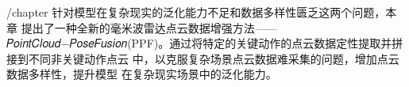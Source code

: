 /chapter{}
针对模型在复杂现实的泛化能力不足和数据多样性匮乏这两个问题，本章
提出了一种全新的毫米波雷达点云数据增强方法——𝑃𝑜𝑖𝑛𝑡𝐶𝑙𝑜𝑢𝑑−𝑃𝑜𝑠𝑒𝐹𝑢𝑠𝑖𝑜𝑛(PPF)。通过将特定的关键动作的点云数据定性提取并拼接到不同非关键动作点云
中，以克服复杂场景点云数据难采集的问题，增加点云数据多样性，提升模型
在复杂现实场景中的泛化能力。
